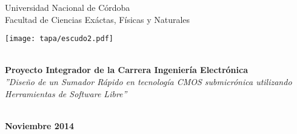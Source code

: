 \begin{titlepage}
\pagestyle{empty}       

\begin{center}
	\Huge{Universidad Nacional de Córdoba\\}
	\Large {Facultad de Ciencias Exáctas, Físicas y Naturales}\\

\vspace{1cm}

\texttt{[image: tapa/escudo2.pdf]}

\vspace{1cm}

	\Huge \textbf{\\[2ex]Proyecto Integrador de la Carrera Ingeniería Electrónica}
	\Large \textsl{\\[2ex] ''Diseño de un Sumador Rápido en tecnología CMOS submicrónica utilizando Herramientas de Software Libre''}

	\begin{normalsize}
	\end{normalsize}
	\begin{large}	
	\\ \textbf{Noviembre 2014}
	\end{large}

\end{center}

\vspace{0.5cm}

\begin{center}

\end{center}

\hfuzz=50pt
\end{titlepage}
